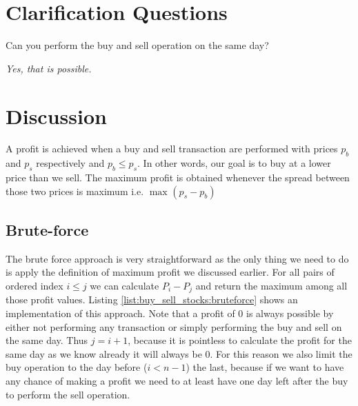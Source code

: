 \section{Clarification Questions}

\begin{QandA}
	\begin{questionitem} \begin{question} Can you perform the buy and sell operation on the same day?  \end{question}      
    \begin{answered}
		\textit{Yes, that is possible.}
	\end{answered} \end{questionitem}
\end{QandA}

\section{Discussion}
\label{buy_sell_stocks:sec:discussion}
A profit is achieved when a buy and sell transaction are performed with prices $p_b$ and $p_s$ respectively and $p_b \leq p_s$. In other words, our goal is to buy at a lower price than we sell. The maximum profit is obtained whenever the spread between those two prices is maximum i.e. $\max_{}{(p_s - p_b)}$

\subsection{Brute-force}
\label{buy_sell_stocks:sec:bruteforce}
The brute force approach is very straightforward as the only thing we need to do is apply the definition of maximum profit we discussed earlier. For all pairs of ordered index $i \leq j$ we can calculate $P_i - P_j$ and return the maximum among all those profit values. Listing \ref{list:buy_sell_stocks:bruteforce} shows an implementation of this approach. Note that a profit of $0$ is always possible by either not performing any transaction or simply performing the buy and sell on the same day. Thus $j = i+1$, because it is pointless to calculate the profit for the same day as we know already it will always be $0$. For this reason we also limit the buy operation to the day before ($i< n-1$) the last, because if we want to have any chance of making a profit we need to at least have one day left after the buy to perform the sell operation. 



